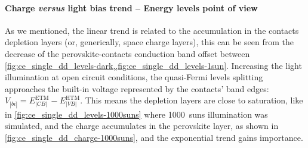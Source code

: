 		\paragraph{Charge \textit{versus} light bias trend -- Energy levels point of view}\label{ce_energy_levels}
		As we mentioned, the linear trend is related to the accumulation in the contacts depletion layers (or, generically, space charge layers), this can be seen from the decrease of the perovskite-contacts conduction band offset between \cref{fig:ce_single_dd_levels-dark,,fig:ce_single_dd_levels-1sun}.
		Increasing the light illumination at open circuit conditions, the quasi-Fermi levels splitting approaches the built-in voltage represented by the contacts' band edges: $V_|bi| = E_|CB|^{\mathrm{ETM}} - E_|VB|^{\mathrm{HTM}}$.
		This means the depletion layers are close to saturation, like in \cref{fig:ce_single_dd_levels-1000suns} where \SI{1000}{suns} illumination was simulated, and the charge accumulates in the perovskite layer, as shown in \cref{fig:ce_single_dd_charge-1000suns}, and the exponential trend gains importance.

					\begin{figure}
		\end{figure}

